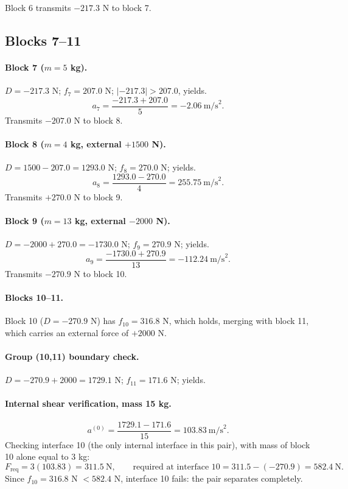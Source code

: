 \documentclass[11pt,a4paper]{article}
\begin{document}
Block 6 transmits $-217.3$ N to block 7.

\subsection{Blocks 7--11}

\paragraph{Block 7 ($m=5$ kg).} $D=-217.3$ N; $f_7 = 207.0$ N; $|{-217.3}|>207.0$, yields.
\[
a_7 = \frac{-217.3+207.0}{5} = -2.06\ \text{m/s}^2 .
\]
Transmits $-207.0$ N to block 8.

\paragraph{Block 8 ($m=4$ kg, external $+1500$ N).} $D = 1500-207.0 = 1293.0$ N; $f_8 = 270.0$ N; yields.
\[
a_8 = \frac{1293.0-270.0}{4} = 255.75\ \text{m/s}^2 .
\]
Transmits $+270.0$ N to block 9.

\paragraph{Block 9 ($m=13$ kg, external $-2000$ N).} $D = -2000+270.0 = -1730.0$ N; $f_9 = 270.9$ N; yields.
\[
a_9 = \frac{-1730.0+270.9}{13} = -112.24\ \text{m/s}^2 .
\]
Transmits $-270.9$ N to block 10.

\paragraph{Blocks 10--11.} Block 10 ($D=-270.9$ N) has $f_{10}=316.8$ N, which holds, merging with block 11, which carries an external force of $+2000$ N.

\paragraph{Group (10,11) boundary check.} $D = -270.9+2000 = 1729.1$ N; $f_{11}=171.6$ N; yields.

\paragraph{Internal shear verification, mass 15 kg.}
\[
a^{(0)} = \frac{1729.1-171.6}{15} = 103.83\ \text{m/s}^2 .
\]
Checking interface 10 (the only internal interface in this pair), with mass of block 10 alone equal to 3 kg:
\[
F_{\mathrm{req}} = 3(103.83) = 311.5\ \text{N}, \qquad \text{required at interface 10} = 311.5-(-270.9) = 582.4\ \text{N}.
\]
Since $f_{10}=316.8$ N $< 582.4$ N, interface 10 fails: the pair separates completely.
\end{document}
